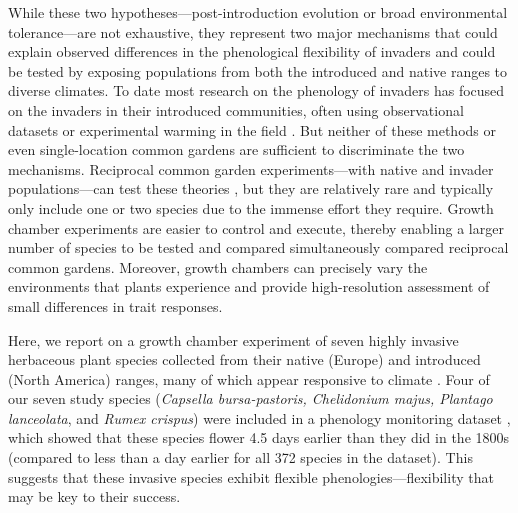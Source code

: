 \documentclass[11pt]{article}\usepackage[]{graphicx}\usepackage[]{color}
\begin{document}
While these two hypotheses---post-introduction evolution or broad environmental tolerance---are not exhaustive, they represent two major mechanisms that could explain observed differences in the phenological flexibility of invaders \parencite{Wolkovich2014,Reeb2020,Zettlemoyer2019} and could be tested by exposing populations from both the introduced and native ranges to diverse climates. To date most research on the phenology of invaders has focused on the invaders in their introduced communities, often using observational datasets \parencite[e.g.,][]{Wolkovich2013} or experimental warming in the field \parencite[e.g.,][]{Zettlemoyer2019}. But neither of these methods or even single-location common gardens \parencite[i.e., testing individuals from only one part of the range or in only one site,][]{Conner2004,Vitasse2009} are sufficient to discriminate the two mechanisms. Reciprocal common garden experiments---with native and invader populations---can test these theories \parencite[e.g.,][]{Williams2008,Lamarque2015}, but they are relatively rare and typically only include one or two species due to the immense effort they require. Growth chamber experiments are easier to control and execute, thereby enabling a larger number of species to be tested and compared simultaneously compared reciprocal common gardens. Moreover, growth chambers can precisely vary the environments that plants experience and provide high-resolution assessment of small differences in trait responses. 

Here, we report on a growth chamber experiment of seven highly invasive herbaceous plant species collected from their native (Europe) and introduced (North America) ranges, many of which appear responsive to climate \parencite{Wolkovich2014}. Four of our seven study species (\textit{Capsella bursa-pastoris, Chelidonium majus, Plantago lanceolata}, and \textit{Rumex crispus}) were included in a phenology monitoring dataset \parencite[the Concord Phenology Dataset,][]{Willis:2008bf}, which showed that these species flower 4.5 days earlier than they did in the 1800s (compared to less than a day earlier for all 372 species in the dataset). This suggests that these invasive species exhibit flexible phenologies---flexibility that may be key to their success. 
\end{document}
